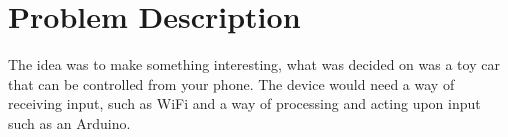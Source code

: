 \section{Problem Description}
\par
The idea was to make something interesting, what was decided on was a toy car that can be controlled from your phone. The device would need a way of receiving input, such as WiFi and a way of processing and acting upon input such as an Arduino.
